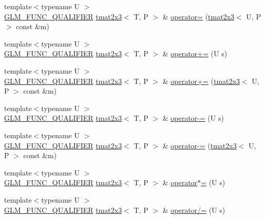 \begin{DoxyCompactItemize}
\item 
{\footnotesize template$<$typename U $>$ }\\\hyperlink{setup_8hpp_a33fdea6f91c5f834105f7415e2a64407}{G\+L\+M\+\_\+\+F\+U\+N\+C\+\_\+\+Q\+U\+A\+L\+I\+F\+I\+ER} \hyperlink{structglm_1_1detail_1_1tmat2x3}{tmat2x3}$<$ T, P $>$ \& \hyperlink{structglm_1_1detail_1_1tmat2x3_a1c28fce0a5ae7b18120851f7a44f9448}{operator=} (\hyperlink{structglm_1_1detail_1_1tmat2x3}{tmat2x3}$<$ U, P $>$ const \&m)
\item 
{\footnotesize template$<$typename U $>$ }\\\hyperlink{setup_8hpp_a33fdea6f91c5f834105f7415e2a64407}{G\+L\+M\+\_\+\+F\+U\+N\+C\+\_\+\+Q\+U\+A\+L\+I\+F\+I\+ER} \hyperlink{structglm_1_1detail_1_1tmat2x3}{tmat2x3}$<$ T, P $>$ \& \hyperlink{structglm_1_1detail_1_1tmat2x3_a4cc0ac05c7c7c0ca0922739828ea087e}{operator+=} (U s)
\item 
{\footnotesize template$<$typename U $>$ }\\\hyperlink{setup_8hpp_a33fdea6f91c5f834105f7415e2a64407}{G\+L\+M\+\_\+\+F\+U\+N\+C\+\_\+\+Q\+U\+A\+L\+I\+F\+I\+ER} \hyperlink{structglm_1_1detail_1_1tmat2x3}{tmat2x3}$<$ T, P $>$ \& \hyperlink{structglm_1_1detail_1_1tmat2x3_a5e17d74534e51b89fc4ef088fa42c867}{operator+=} (\hyperlink{structglm_1_1detail_1_1tmat2x3}{tmat2x3}$<$ U, P $>$ const \&m)
\item 
{\footnotesize template$<$typename U $>$ }\\\hyperlink{setup_8hpp_a33fdea6f91c5f834105f7415e2a64407}{G\+L\+M\+\_\+\+F\+U\+N\+C\+\_\+\+Q\+U\+A\+L\+I\+F\+I\+ER} \hyperlink{structglm_1_1detail_1_1tmat2x3}{tmat2x3}$<$ T, P $>$ \& \hyperlink{structglm_1_1detail_1_1tmat2x3_a9390f2064f9bdea63dc4e796822a42d4}{operator-\/=} (U s)
\item 
{\footnotesize template$<$typename U $>$ }\\\hyperlink{setup_8hpp_a33fdea6f91c5f834105f7415e2a64407}{G\+L\+M\+\_\+\+F\+U\+N\+C\+\_\+\+Q\+U\+A\+L\+I\+F\+I\+ER} \hyperlink{structglm_1_1detail_1_1tmat2x3}{tmat2x3}$<$ T, P $>$ \& \hyperlink{structglm_1_1detail_1_1tmat2x3_af1abd73945e5346e7ae1e5a953979aff}{operator-\/=} (\hyperlink{structglm_1_1detail_1_1tmat2x3}{tmat2x3}$<$ U, P $>$ const \&m)
\item 
{\footnotesize template$<$typename U $>$ }\\\hyperlink{setup_8hpp_a33fdea6f91c5f834105f7415e2a64407}{G\+L\+M\+\_\+\+F\+U\+N\+C\+\_\+\+Q\+U\+A\+L\+I\+F\+I\+ER} \hyperlink{structglm_1_1detail_1_1tmat2x3}{tmat2x3}$<$ T, P $>$ \& \hyperlink{structglm_1_1detail_1_1tmat2x3_acb4473b53bf98d8330710d21fcfd9413}{operator$\ast$=} (U s)
\item 
{\footnotesize template$<$typename U $>$ }\\\hyperlink{setup_8hpp_a33fdea6f91c5f834105f7415e2a64407}{G\+L\+M\+\_\+\+F\+U\+N\+C\+\_\+\+Q\+U\+A\+L\+I\+F\+I\+ER} \hyperlink{structglm_1_1detail_1_1tmat2x3}{tmat2x3}$<$ T, P $>$ \& \hyperlink{structglm_1_1detail_1_1tmat2x3_a98a33b4a96b4e55c24aee023e382eedd}{operator/=} (U s)
\end{DoxyCompactItemize}


